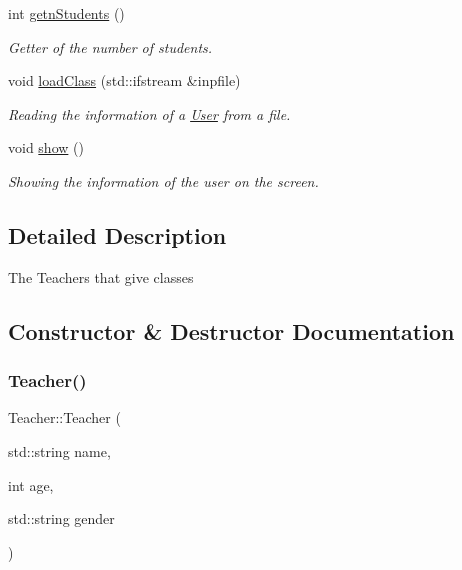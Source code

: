 \begin{DoxyCompactItemize}
int \mbox{\hyperlink{class_teacher_ae2e2666d5c8eceb29d6650d7b15958b1}{getn\+Students}} ()
\begin{DoxyCompactList}\small\item\em Getter of the number of students. \end{DoxyCompactList}\item 
void \mbox{\hyperlink{class_teacher_a1f204644af41c43ff3bd0582393062fa}{load\+Class}} (std\+::ifstream \&inpfile)
\begin{DoxyCompactList}\small\item\em Reading the information of a \mbox{\hyperlink{class_user}{User}} from a file. \end{DoxyCompactList}\item 
\mbox{\label{class_teacher_a3045744c4ef7e1189caac2ae9a126254}} 
void \mbox{\hyperlink{class_teacher_a3045744c4ef7e1189caac2ae9a126254}{show}} ()
\begin{DoxyCompactList}\small\item\em Showing the information of the user on the screen. \end{DoxyCompactList}\end{DoxyCompactItemize}


\subsection{Detailed Description}
The Teachers that give classes 

\subsection{Constructor \& Destructor Documentation}
\mbox{\label{class_teacher_adb308468e6ed8bbbffaba9cbf1ae646e}} 
\subsubsection{\texorpdfstring{Teacher()}{Teacher()}}
{\footnotesize\ttfamily Teacher\+::\+Teacher (\begin{DoxyParamCaption}\item[{std\+::string}]{name,  }\item[{int}]{age,  }\item[{std\+::string}]{gender }\end{DoxyParamCaption})}




